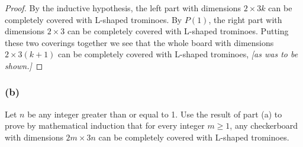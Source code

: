 \documentclass[14pt]{extarticle}
\begin{document}
\begin{proof}
    By the inductive hypothesis, the left part with dimensions $2 \times 3k$ can be completely covered with L-shaped trominoes. By $P(1)$, the right part with dimensions $2 \times 3$ can be completely covered with L-shaped trominoes. Putting these two coverings together we see that the whole board with dimensions $2 \times 3(k+1)$ can be completely covered with L-shaped trominoes, {\it [as was to be shown.]}
\end{proof}

\subsubsection{(b)}
Let $n$ be any integer greater than or equal to 1. Use the result of part (a) to prove by mathematical induction that for every integer $m \geq 1$, any checkerboard with dimensions $2m \times 3n$ can be completely covered with L-shaped trominoes.
\end{document}
